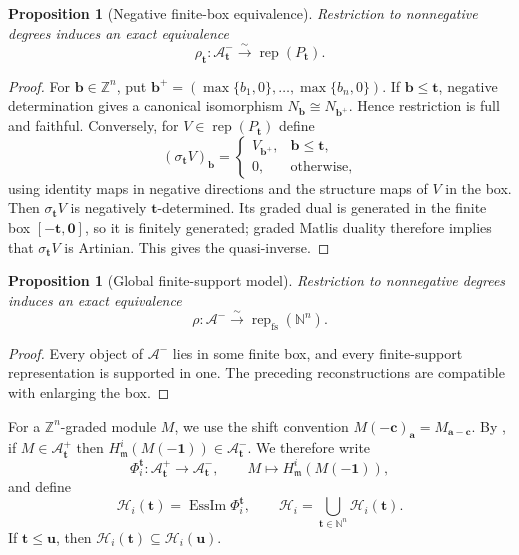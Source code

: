 \documentclass[10pt,a4paper]{amsart}
\newtheorem{proposition}[theorem]{Proposition}
\newcommand{\Rep}{\operatorname{rep}}
\newcommand{\EssIm}{\operatorname{EssIm}}
\begin{document}
\begin{proposition}[Negative finite-box equivalence]\label{prop:negative-box}
Restriction to nonnegative degrees induces an exact equivalence
\[
\rho_{\mathbf t}:\mathcal A^-_{\mathbf t}
\xrightarrow{\sim}\Rep(P_{\mathbf t}).
\]
\end{proposition}

\begin{proof}
For $\mathbf b\in\mathbb Z^n$, put
$\mathbf b^+=(\max\{b_1,0\},\ldots,\max\{b_n,0\})$.  If
$\mathbf b\le\mathbf t$, negative determination gives a canonical isomorphism
$N_{\mathbf b}\cong N_{\mathbf b^+}$.  Hence restriction is full
and faithful.  Conversely, for $V\in\Rep(P_{\mathbf t})$ define
\[
(\sigma_{\mathbf t}V)_{\mathbf b}=
\begin{cases}
V_{\mathbf b^+},&\mathbf b\le\mathbf t,\\
0,&\text{otherwise},
\end{cases}
\]
using identity maps in negative directions and the structure maps of $V$ in
the box.  Then $\sigma_{\mathbf t}V$ is negatively $\mathbf t$-determined.
Its graded dual is generated in the finite box $[-\mathbf t,\mathbf0]$, so it
is finitely generated; graded Matlis duality therefore implies that
$\sigma_{\mathbf t}V$ is Artinian.  This gives the quasi-inverse.
\end{proof}

\begin{proposition}[Global finite-support model]\label{prop:global-fs}
Restriction to nonnegative degrees induces an exact equivalence
\[
\rho:\mathcal A^-\xrightarrow{\sim}\Rep_{\mathrm{fs}}(\mathbb N^n).
\]
\end{proposition}

\begin{proof}
Every object of $\mathcal A^-$ lies in some finite box, and every finite-support
representation is supported in one.  The preceding reconstructions are
compatible with enlarging the box.
\end{proof}

For a $\mathbb{Z}^n$-graded module $M$, we use the shift convention
$M(-\mathbf c)_{\mathbf a}=M_{\mathbf a-\mathbf c}$. By \cite[Proposition~2.8 and Remark~2.9]{BF}, if
$M\in\mathcal A^+_{\mathbf t}$ then
$H^i_{\mathfrak m}(M(-\mathbf1))\in\mathcal A^-_{\mathbf t}$.  We therefore
write
\[
\Phi_i^{\mathbf t}:\mathcal A^+_{\mathbf t}\longrightarrow
\mathcal A^-_{\mathbf t},\qquad
M\longmapsto H^i_{\mathfrak m}(M(-\mathbf1)),
\]
and define
\[
\mathcal H_i(\mathbf t)=\EssIm\Phi_i^{\mathbf t},
\qquad
\mathcal H_i=\bigcup_{\mathbf t\in\mathbb N^n}\mathcal H_i(\mathbf t).
\]
If $\mathbf t\le\mathbf u$, then
$\mathcal H_i(\mathbf t)\subseteq\mathcal H_i(\mathbf u)$.
\end{document}
